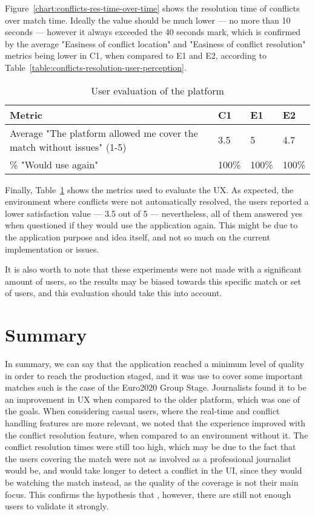 Figure~\ref{chart:conflicts-res-time-over-time} shows the resolution time of conflicts over match time. Ideally the value should be much lower --- no more than 10 seconds --- however it always exceeded the 40 seconds mark, which is confirmed by the average "Easiness of conflict location" and "Easiness of conflict resolution" metrics being lower in C1, when compared to E1 and E2, according to Table~\ref{table:conflicts-resolution-user-perception}. 

\begin{table}
    \centering
    \caption{User evaluation of the platform}
    \begin{tabular}{|l|l|l|l|}
        \hline
        \textbf{Metric}                        & \textbf{C1} & \textbf{E1} & \textbf{E2} \\ \hline \hline
        Average "The platform allowed me cover the match without issues" (1-5)   & 3.5  & 5  & 4.7  \\ \hline
        \% "Would use again"   & 100\%  & 100\%  & 100\%  \\ \hline
    \end{tabular}
    \label{table:user-platform-evaluation}
\end{table}

Finally, Table~\ref{table:user-platform-evaluation} shows the metrics used to evaluate the UX. As expected, the environment where conflicts were not automatically resolved, the users reported a lower satisfaction value --- 3.5 out of 5 --- nevertheless, all of them answered yes when questioned if they would use the application again. This might be due to the application purpose and idea itself, and not so much on the current implementation or issues.

It is also worth to note that these experiments were not made with a significant amount of users, so the results may be biased towards this specific match or set of users, and this evaluation should take this into account.

\section{Summary}

In summary, we can say that the application reached a minimum level of quality in order to reach the production staged, and it was use to cover some important matches such is the case of the Euro2020 Group Stage. Journalists found it to be an improvement in UX when compared to the older platform, which was one of the goals. When considering casual users, where the real-time and conflict handling features are more relevant, we noted that the experience improved with the conflict resolution feature, when compared to an environment without it. The conflict resolution times were still too high, which may be due to the fact that the users covering the match were not as involved as a professional journalist would be, and would take longer to detect a conflict in the UI, since they would be watching the match instead, as the quality of the coverage is not their main focus. This confirms the hypothesis that , however, there are still not enough users to validate it strongly.
